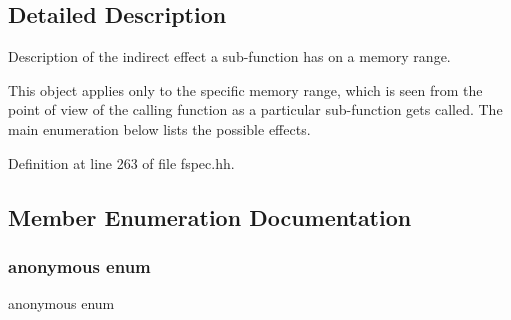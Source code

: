 \subsection{Detailed Description}
Description of the indirect effect a sub-\/function has on a memory range. 

This object applies only to the specific memory range, which is seen from the point of view of the calling function as a particular sub-\/function gets called. The main enumeration below lists the possible effects. 

Definition at line 263 of file fspec.\+hh.



\subsection{Member Enumeration Documentation}
\mbox{\label{class_effect_record_a9a77875d39274819c56d6e4df5f23ab0}} 
\subsubsection{\texorpdfstring{anonymous enum}{anonymous enum}}
{\footnotesize\ttfamily anonymous enum}

